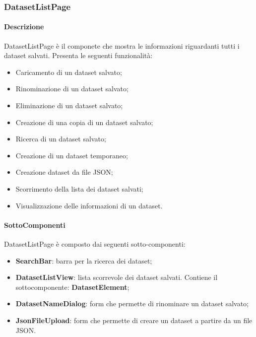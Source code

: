\subsubsection{DatasetListPage}
\label{sec:DatasetListPage}
\paragraph{Descrizione}
DatasetListPage è il componete che mostra le informazioni riguardanti tutti i dataset salvati. Presenta le seguenti funzionalità:
\begin{itemize}
    \item Caricamento di un dataset salvato;
    \item Rinominazione di un dataset salvato;
    \item Eliminazione di un dataset salvato;
    \item Creazione di una copia di un dataset salvato;
    \item Ricerca di un dataset salvato;
    \item Creazione di un dataset temporaneo;
    \item Creazione dataset da file JSON;
    \item Scorrimento della lista dei dataset salvati;
    \item Visualizzazione delle informazioni di un dataset.
\end{itemize}
\paragraph{SottoComponenti}
DatasetListPage è composto dai seguenti sotto-componenti:
\begin{itemize}
    \item \textbf{SearchBar}: barra per la ricerca dei dataset;
    \item \textbf{DatasetListView}: lista scorrevole dei dataset salvati. Contiene il sottocomponente: \textbf{DatasetElement};
    \item \textbf{DatasetNameDialog}: form che permette di rinominare un dataset salvato;
    \item \textbf{JsonFileUpload}: form che permette di creare un dataset a partire da un file JSON.
\end{itemize}

